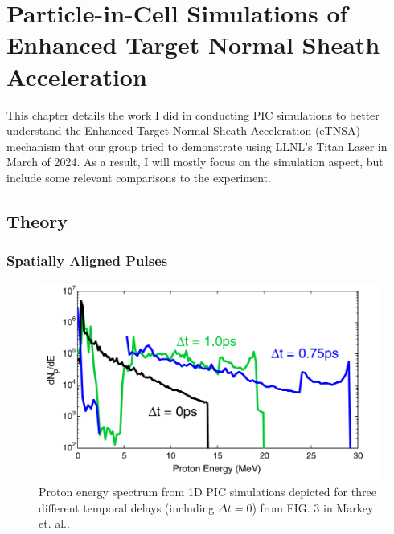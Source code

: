 \chapter{Particle-in-Cell Simulations of Enhanced Target Normal Sheath Acceleration} \label{ch:4}

This chapter details the work I did in conducting PIC simulations to better understand the Enhanced Target Normal Sheath Acceleration (eTNSA) mechanism that our group tried to demonstrate using LLNL's Titan Laser in March of 2024. As a result, I will mostly focus on the simulation aspect, but include some relevant comparisons to the experiment. 

\section{Theory}

\subsection{Spatially Aligned Pulses} \label{sec:spatialalign}

\begin{figure}
	\centering 
	\includegraphics[width=0.75\linewidth]{planning/images/Markey_Spectrum.PNG}
	\caption{Proton energy spectrum from 1D PIC simulations depicted for three different temporal delays (including $\Delta t = 0$) from FIG. 3 in Markey et. al.\cite{Markey_2010_PRL}.}
	\label{fig:markey_spectrum}
\end{figure}


